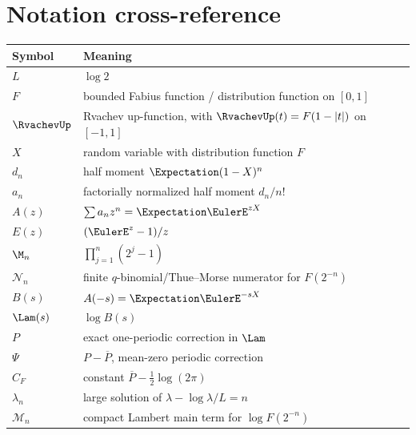 \documentclass[11pt,oneside]{article}
\theoremstyle{definition}
\theoremstyle{remark}
\begin{document}
\section{Notation cross-reference}
\label{dyadicasym:app:notation}

\begingroup\small
\begin{longtable}{@{}ll@{}}
\toprule
Symbol & Meaning\\
\midrule
\endhead
$L$ & $\log2$\\
$F$ & bounded Fabius function / distribution function on $[0,1]$\\
$\RvachevUp$ & Rvachev up-function, with $\RvachevUp(t)=F(1-|t|)$ on $[-1,1]$\\
$X$ & random variable with distribution function $F$\\
$d_n$ & half moment $\Expectation(1-X)^n$\\
$a_n$ & factorially normalized half moment $d_n/n!$\\
$A(z)$ & $\sum a_nz^n=\Expectation\EulerE^{zX}$\\
$E(z)$ & $(\EulerE^z-1)/z$\\
$\M_n$ & $\prod_{j=1}^n(2^j-1)$\\
$\mathcal N_n$ & finite $q$-binomial/Thue--Morse numerator for $F(2^{-n})$\\
$B(s)$ & $A(-s)=\Expectation\EulerE^{-sX}$\\
$\Lam(s)$ & $\log B(s)$\\
$P$ & exact one-periodic correction in $\Lam$\\
$\Psi$ & $P-\overline P$, mean-zero periodic correction\\
$C_F$ & constant $\overline P-\tfrac12\log(2\pi)$\\
$\lambda_n$ & large solution of $\lambda-\log\lambda/L=n$\\
$\mathcal M_n$ & compact Lambert main term for $\log F(2^{-n})$\\
\bottomrule
\end{longtable}
\endgroup
\end{document}
